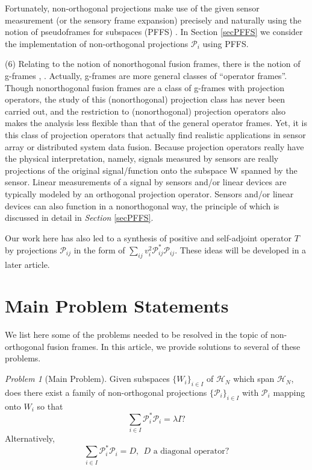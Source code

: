 \documentclass[11pt,reqno]{amsart}
\theoremstyle{remark}
\newtheorem{problem}[thm]{Problem}
\begin{document}
Fortunately, non-orthogonal projections make use of the given sensor measurement (or the sensory frame expansion) precisely and naturally using the notion of pseudoframes for subspaces (PFFS) \cite{LiOgPFFS98}.  In Section \ref{secPFFS} we consider the implementation of non-orthogonal projections ${{\mathcal P}}_i$ using PFFS.

(6) Relating to the notion of nonorthogonal fusion frames,
there is the notion of g-frames \cite{sun2006g}, \cite{sun2007stability}.  Actually,
g-frames are more general classes of ``operator frames''.  Though nonorthogonal fusion frames are a class of g-frames with projection operators, the study of this (nonorthogonal) projection class has never been carried out, and the restriction to (nonorthogonal) projection operators also makes the analysis less flexible than that of the general operator frames.  Yet, it is this class of projection operators that actually find realistic applications in sensor array or distributed system data fusion.  Because projection operators really have the physical interpretation, namely, signals measured by sensors are really projections of the original signal/function onto the subspace W spanned by the sensor. Linear measurements of a signal by sensors and/or linear devices are typically modeled by an orthogonal projection operator.  Sensors and/or linear devices can also function in a nonorthogonal way, the principle of which is discussed in detail in {\em Section} \ref{secPFFS}.

Our work here has also led to a synthesis of positive and self-adjoint operator $T$ by projections ${{\mathcal P}}_{ij}$ in the form of $\sum_{ij}v_i^2{{\mathcal P}}^*_{ij}{{\mathcal P}}_{ij}$.  These ideas will be developed in a later article.

\section{Main Problem Statements}

We list here some of the problems needed to be resolved in the topic of non-orthogonal fusion frames.  In this article, we provide solutions to several of these problems.

\begin{problem}[Main Problem]  \label{prob1} Given subspaces $\{W_i\}_{i\in I}$ of
${\mathcal H}_N$ which span ${\mathcal H}_N$, does there exist a family of non-orthogonal
projections $\{{\mathcal P}_i\}_{i\in I}$ with ${\mathcal P}_i$ mapping onto $W_i$ so that
\[ \sum_{i\in I}{\mathcal P}_i^*{\mathcal P}_i = \lambda I?\]
Alternatively,
\[ \sum_{i\in I}{\mathcal P}_i^*{\mathcal P}_i =D,\ \ \mbox{$D$ a diagonal operator}?\]
\end{problem}
\end{document}
